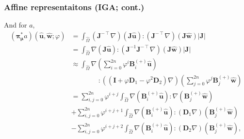 \begin{frame}
  \frametitle{Affine representaitons (IGA; cont.)}

  And for $a$,
  \begin{align*}
    \textstyle
    ({\bm\pi}^*_{\bm\mu}a)(
    \hat{\bm u},
    \hat{\bm w};
    \varphi
    ) &\textstyle = \int_{\hat{\Omega}}
        (\bm J^{-\intercal} \nabla) (\bm J \hat{\bm u}) :
        (\bm J^{-\intercal} \nabla) (\bm J \hat{\bm w}) |\bm J| \\
        &\textstyle = \int_{\hat{\Omega}}
        \nabla (\bm J \hat{\bm u}) :
        (\bm J^{-1} \bm J^{-\intercal} \nabla) (\bm J \hat{\bm w}) |\bm J| \\
      &\textstyle \approx \int_{\hat{\Omega}}
        \nabla \left( \sum_{i=0}^{2n} \varphi^i \bm B^{(+)}_i \hat{\bm u} \right) \\
        & \qquad \qquad \textstyle : ((\bm I + \varphi \bm D_1 - \varphi^2 \bm D_2) \nabla)
        \left( \sum_{j=0}^{2n} \varphi^j \bm B^{(+)}_j \hat{\bm w} \right) \\
      &\textstyle = \sum_{i,j=0}^{2n} \varphi^{i+j} \int_{\hat{\Omega}}
        \nabla (\bm B^{(+)}_i \hat{\bm u}) : \nabla (\bm B^{(+)}_j \hat{\bm w}) \\
      &\textstyle + \sum_{i,j=0}^{2n} \varphi^{i+j+1} \int_{\hat{\Omega}}
        \nabla (\bm B^{(+)}_i \hat{\bm u}) : (\bm D_1 \nabla) (\bm B^{(+)}_j \hat{\bm w}) \\
      &\textstyle - \sum_{i,j=0}^{2n} \varphi^{i+j+2} \int_{\hat{\Omega}}
        \nabla (\bm B^{(+)}_i \hat{\bm u}) : (\bm D_2 \nabla) (\bm B^{(+)}_j \hat{\bm w}),
  \end{align*}
\end{frame}
